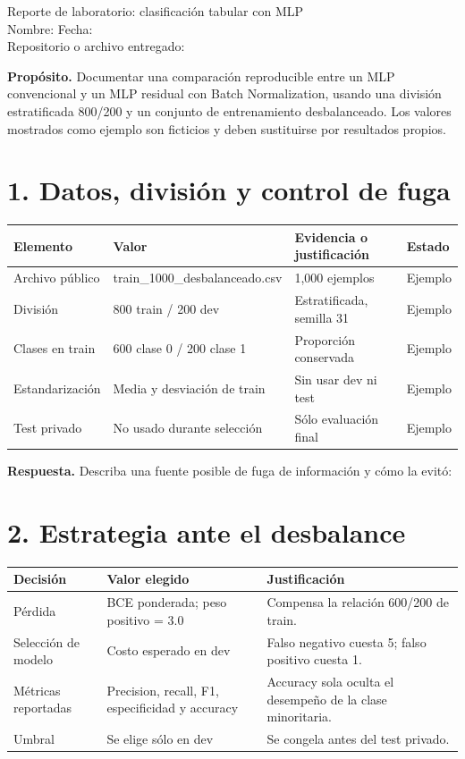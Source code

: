 \documentclass[10pt]{article}
\newcommand{\campo}[1]{\underline{\hspace{#1}}}
\begin{document}
\begin{center}
{\LARGE Reporte de laboratorio: clasificación tabular con MLP}\\[0.4em]
Nombre: \campo{6cm}\hfill Fecha: \campo{3cm}\\
Repositorio o archivo entregado: \campo{10cm}
\end{center}

\textbf{Propósito.} Documentar una comparación reproducible entre un MLP convencional y un MLP residual con Batch Normalization, usando una división estratificada 800/200 y un conjunto de entrenamiento desbalanceado. Los valores mostrados como ejemplo son ficticios y deben sustituirse por resultados propios.

\section*{1. Datos, división y control de fuga}
\begin{tabular}{@{}llll@{}}
\toprule
Elemento & Valor & Evidencia o justificación & Estado\\
\midrule
Archivo público & train\_1000\_desbalanceado.csv & 1,000 ejemplos & Ejemplo\\
División & 800 train / 200 dev & Estratificada, semilla 31 & Ejemplo\\
Clases en train & 600 clase 0 / 200 clase 1 & Proporción conservada & Ejemplo\\
Estandarización & Media y desviación de train & Sin usar dev ni test & Ejemplo\\
Test privado & No usado durante selección & Sólo evaluación final & Ejemplo\\
\bottomrule
\end{tabular}

\vspace{0.7em}
\textbf{Respuesta.} Describa una fuente posible de fuga de información y cómo la evitó:

\vspace{2.0cm}

\section*{2. Estrategia ante el desbalance}
\begin{tabular}{@{}p{3.1cm}p{5.4cm}p{5.3cm}@{}}
\toprule
Decisión & Valor elegido & Justificación\\
\midrule
Pérdida & BCE ponderada; peso positivo = 3.0 & Compensa la relación 600/200 de train.\\
Selección de modelo & Costo esperado en dev & Falso negativo cuesta 5; falso positivo cuesta 1.\\
Métricas reportadas & Precision, recall, F1, especificidad y accuracy & Accuracy sola oculta el desempeño de la clase minoritaria.\\
Umbral & Se elige sólo en dev & Se congela antes del test privado.\\
\bottomrule
\end{tabular}
\end{document}
